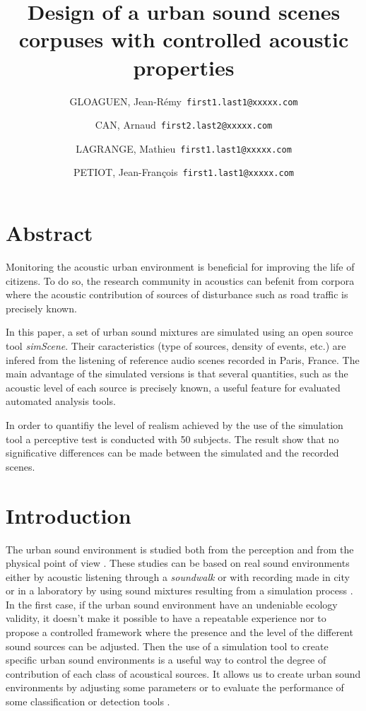 \documentclass[a4,11pt,twocolumn]{article}
\title{Design of a urban sound scenes corpuses with controlled acoustic properties}     %
\author{
  GLOAGUEN, Jean-R\'emy\      \texttt{first1.last1@xxxxx.com}
  \and
  CAN, Arnaud\      \texttt{first2.last2@xxxxx.com}
  \and
  LAGRANGE, Mathieu\      \texttt{first1.last1@xxxxx.com}
  \and
  PETIOT, Jean-Fran\c cois\      \texttt{first1.last1@xxxxx.com}
}
\begin{document}
\maketitle

\section*{Abstract}

Monitoring the acoustic urban environment is beneficial for improving the life of citizens. To do so, the research community in acoustics can befenit from corpora where the acoustic contribution of sources of disturbance such as road traffic is precisely known.

In this paper, a set of urban sound mixtures are simulated using an open source tool \textit{simScene}. Their caracteristics (type of sources, density of events, etc.) are infered from the listening of reference audio scenes recorded in Paris, France. The main advantage of the simulated versions is that several quantities, such as the acoustic level of each source is precisely known, a useful feature for evaluated automated analysis tools.

In order to quantifiy the level of realism achieved by the use of the simulation tool a perceptive test is conducted with 50 subjects. The result show that no significative differences can be made between the simulated and the recorded scenes.

\section*{Introduction}

The urban sound environment is studied both from the perception \cite{jin_yong_soundwalk_2013} \cite{botteldooren_understanding_2011} and from the physical point of view \cite{can_describing_2015} \cite{raimbault_ambient_2003}. These studies can be based on real sound environments either by acoustic listening through a \textit{soundwalk} \cite{adams_soundwalking_2008} or with recording made in city \cite{botteldooren_temporal_2006} or in a laboratory by using sound mixtures resulting from a simulation process \cite{lafay_new_2014}. In the first case, if the urban sound environment have an undeniable ecology validity, it doesn't make it possible to have a repeatable experience nor to propose a controlled framework where the presence and the level of the different sound sources can be adjusted. Then the use of a simulation tool to create specific urban sound environments is a useful way to control the degree of contribution of each class of acoustical sources. It allows us to create urban sound environments by adjusting some parameters \cite{bruce_development_2009} or to evaluate the performance of some classification or detection tools \cite{giannoulis_detection_2013}.
\end{document}
